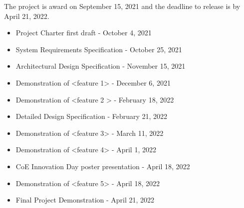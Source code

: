 The project is award on September 15, 2021 and the deadline to release is by April 21, 2022.
\begin{itemize}
  \item Project Charter first draft - October 4, 2021 
  \item System Requirements Specification - October 25, 2021
  \item Architectural Design Specification - November 15, 2021
  \item Demonstration of <feature 1> -  December 6, 2021
  \item Demonstration of <feature 2 > - February 18, 2022
  \item Detailed Design Specification - February 21, 2022
  \item Demonstration of <feature 3> - March 11, 2022
   \item Demonstration of <feature 4> - April 1, 2022
  \item CoE Innovation Day poster presentation - April 18, 2022
  \item Demonstration of <feature 5> - April 18, 2022
  \item Final Project Demonstration - April 21, 2022
\end{itemize}